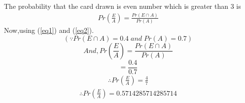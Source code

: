 \documentclass[journal,12pt,twocolumn]{IEEEtran}
\begin{document}
The probability that the card drawn is even number which is greater than 3 is
\begin{align}
    Pr\left(\frac{E}{A}\right)=\frac{Pr(E\cap A)}{Pr(A)}
\end{align}
Now,using (\ref{eq1}) and (\ref{eq2}). 
$$(\because Pr(E \cap A)=0.4\; and \; Pr(A)=0.7)$$
$$And, Pr\left(\frac{E}{A}\right)=\frac{Pr(E\cap A)}{Pr(A)}$$
$$=\frac{0.4}{0.7}$$
\begin{align}
\therefore Pr\left(\frac{E}{A}\right)=\frac{4}{7}    
\end{align}
\begin{align}
\therefore Pr\left(\frac{E}{A}\right)=0.5714285714285714    
\end{align}
\end{document}
